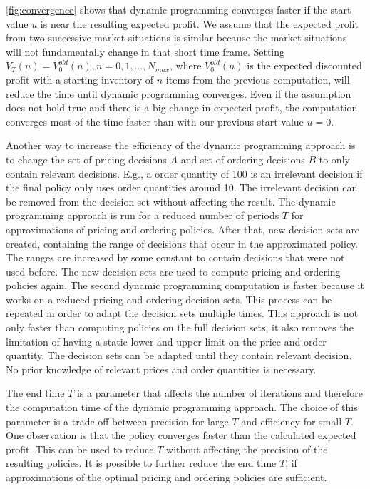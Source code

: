 \cref{fig:convergence} shows that dynamic programming converges faster if the start value $u$ is near the resulting expected profit.
We assume that the expected profit from two successive market situations is similar because the market situations will not fundamentally change in that short time frame.
Setting $V_T(n) = V_0^{old}(n), n=0, 1, \ldots, N_{max}$, where $V_0^{old}(n)$ is the expected discounted profit with a starting inventory of $n$ items from the previous computation, will reduce the time until dynamic programming converges.
Even if the assumption does not hold true and there is a big change in expected profit, the computation converges most of the time faster than with our previous start value $u = 0$.

Another way to increase the efficiency of the dynamic programming approach is to change the set of pricing decisions $A$ and set of ordering decisions $B$ to only contain relevant decisions.
E.g., a order quantity of 100 is an irrelevant decision if the final policy only uses order quantities around 10.
The irrelevant decision can be removed from the decision set without affecting the result.
The dynamic programming approach is run for a reduced number of periods $T$ for approximations of pricing and ordering policies.
After that, new decision sets are created, containing the range of decisions that occur in the approximated policy.
The ranges are increased by some constant to contain decisions that were not used before.
The new decision sets are used to compute pricing and ordering policies again.
The second dynamic programming computation is faster because it works on a reduced pricing and ordering decision sets.
This process can be repeated in order to adapt the decision sets multiple times.
This approach is not only faster than computing policies on the full decision sets, it also removes the limitation of having a static lower and upper limit on the price and order quantity.
The decision sets can be adapted until they contain relevant decision.
No prior knowledge of relevant prices and order quantities is necessary.

The end time $T$ is a parameter that affects the number of iterations and therefore the computation time of the dynamic programming approach.
The choice of this parameter is a trade-off between precision for large $T$ and efficiency for small $T$.
One observation is that the policy converges faster than the calculated expected profit.
This can be used to reduce $T$ without affecting the precision of the resulting policies.
It is possible to further reduce the end time $T$, if approximations of the optimal pricing and ordering policies are sufficient.

